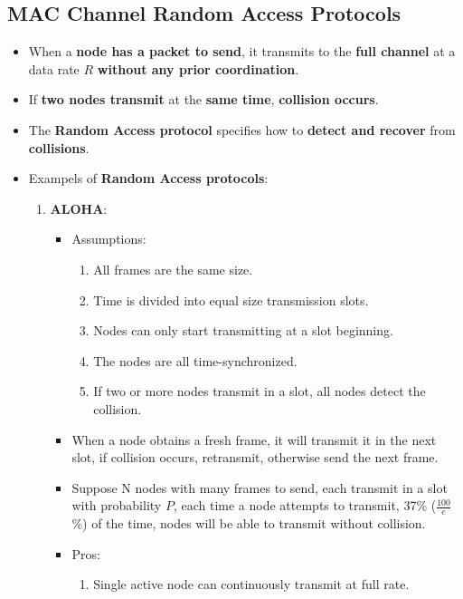 \documentclass{article}
\begin{document}
    \subsection*{MAC Channel Random Access Protocols}
    \begin{itemize}
        \item When a \textbf{node has a packet to send}, it transmits to the \textbf{full channel} at a data rate $R$ \textbf{without any prior coordination}.
        \item If \textbf{two nodes transmit} at the \textbf{same time}, \textbf{collision occurs}.
        \item The \textbf{Random Access protocol} specifies how to \textbf{detect and recover} from \textbf{collisions}.
        \item Exampels of \textbf{Random Access protocols}: 
        \begin{enumerate}
            \item \textbf{ALOHA}:
            \begin{itemize}
                \item Assumptions: 
                \begin{enumerate}
                    \item All frames are the same size.
                    \item Time is divided into equal size transmission slots.
                    \item Nodes can only start transmitting at a slot beginning.
                    \item The nodes are all time-synchronized.
                    \item If two or more nodes transmit in a slot, all nodes detect the collision.
                \end{enumerate}
                \item When a node obtains a fresh frame, it will transmit it in the next slot, if collision occurs, retransmit, otherwise send the next frame.
                \item Suppose N nodes with many frames to send, each transmit in a slot with probability $P$, each time a node attempts to transmit, 37\% ($\frac{100}{e}$\%) of the time, nodes will be able to transmit without collision.
                \item Pros:
                \begin{enumerate}
                    \item Single active node can continuously transmit at full rate.

\end{enumerate}
\end{itemize}
\end{enumerate}
\end{itemize}
\end{document}
